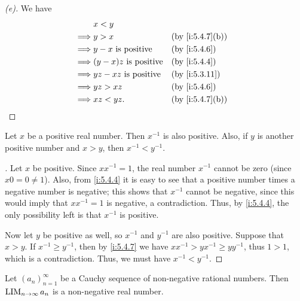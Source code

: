 \begin{proof}[(e)]
  We have
  \begin{align*}
             & x < y                                             \\
    \implies & y > x                        &  & \by{i:5.4.7}[b] \\
    \implies & y - x \text{ is positive}    &  & \by{i:5.4.6}    \\
    \implies & (y - x)z \text{ is positive} &  & \by{i:5.4.4}    \\
    \implies & yz - xz \text{ is positive}  &  & \by{i:5.3.11}   \\
    \implies & yz > xz                      &  & \by{i:5.4.6}    \\
    \implies & xz < yz.                     &  & \by{i:5.4.7}[b]
  \end{align*}
\end{proof}

\begin{prop}\label{i:5.4.8}
  Let \(x\) be a positive real number.
  Then \(x^{-1}\) is also positive.
  Also, if \(y\) is another positive number and \(x > y\), then \(x^{-1} < y^{-1}\).
\end{prop}

\begin{proof}[]
  Let \(x\) be positive.
  Since \(xx^{-1} = 1\), the real number \(x^{-1}\) cannot be zero (since \(x0 = 0 \neq 1\)).
  Also, from \cref{i:5.4.4} it is easy to see that a positive number times a negative number is negative;
  this shows that \(x^{-1}\) cannot be negative, since this would imply that \(xx^{-1} = 1\) is negative, a contradiction.
  Thus, by \cref{i:5.4.4}, the only possibility left is that \(x^{-1}\) is positive.

  Now let \(y\) be positive as well, so \(x^{-1}\) and \(y^{-1}\) are also positive.
  Suppose that \(x > y\).
  If \(x^{-1} \geq y^{-1}\), then by \cref{i:5.4.7} we have \(xx^{-1} > yx^{-1} \geq yy^{-1}\), thus \(1 > 1\), which is a contradiction.
  Thus, we must have \(x^{-1} < y^{-1}\).
\end{proof}

\begin{prop}\label{i:5.4.9}
  Let \((a_n)_{n = 1}^\infty\) be a Cauchy sequence of non-negative rational numbers.
  Then \(\operatorname*{LIM}_{n \to \infty} a_n\) is a non-negative real number.
\end{prop}

